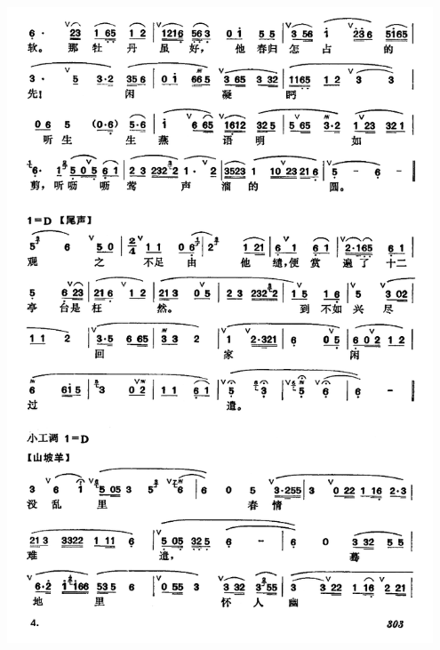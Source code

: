 \documentclass[cn,pad,twocol]{elegantbook}
\begin{document}
\paragraph*{\includegraphics[width=0.95\textwidth]{mudanting/2020-牡丹亭-游园惊梦4}}
\end{document}
